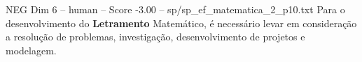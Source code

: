 \begin{textsample}{NEG Dim 6 – human – Score -3.00 – sp/sp\_ef\_matematica\_2\_p10.txt}  \label{ex:f6_neg_005}
Para o desenvolvimento do \textbf{Letramento} Matemático, é necessário levar em consideração a resolução de problemas, investigação, desenvolvimento de projetos e modelagem.

\end{textsample}
